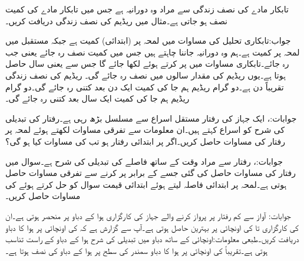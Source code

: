 تابکار مادے کی نصف زندگی  سے مراد وہ دورانیہ ہے جس میں تابکار مادے کی کمیت نصف ہو جاتی ہے۔مثال  میں ریڈیم  کی نصف زندگی دریافت کریں۔

جواب:تابکاری تحلیل کی مساوات  میں لمحہ  پر (ابتدائی) کمیت ہے جبکہ مستقبل میں لمحہ  پر کمیت  ہے۔ہم وہ دورانیہ جاننا چاہتے ہیں جس میں کمیت نصف رہ جائے یعنی جب  رہ جائے۔تابکاری مساوات میں  پر کرتے ہوئے  لکھا جائے گا جس سے   یعنی  سال  حاصل ہوتا ہے۔یوں ریڈیم کی مقدار  سالوں میں نصف رہ جائے گی۔ 
ریڈیم   کی نصف زندگی تقریباً  دن ہے۔دو گرام  ریڈیم ہم جا کی کمیت ایک دن بعد کتنی رہ جائے گی۔دو گرام ریڈیم ہم جا کی کمیت ایک سال بعد کتنی رہ جائے گی۔

جوابات:، 
ایک جہاز کی رفتار مستقل اسراع  سے مسلسل بڑھ رہی ہے۔رفتار کی تبدیلی کی شرح  کو اسراع کہتے ہیں۔ان معلومات سے تفرقی مساوات لکھتے ہوئے لمحہ  پر رفتار  کی مساوات حاصل کریں۔اگر  پر ابتدائی رفتار  ہو تب  کی مساوات کیا ہو گی؟ 

جوابات:، 
رفتار سے مراد وقت کے ساتھ فاصلے کی تبدیلی کی شرح  ہے۔سوال  میں رفتار کی مساوات  حاصل کی گئی جسے  کے برابر پر کرنے سے تفرقی مساوات حاصل ہوتی ہے۔لمحہ  پر ابتدائی فاصلہ  لیتے ہوئے ابتدائی قیمت سوال کو حل کرتے ہوئے   کی مساوات حاصل کریں۔

جوابات:
آواز سے کم رفتار پر پرواز کرنے والے جہاز کی کارگزاری ہوا کے دباو پر منحصر ہوتی ہے۔ان  کی کارگزاری  تا  کی اونچائی پر بہترین حاصل ہوتی ہے۔آپ سے گزارش ہے کہ  کی اونچائی پر ہوا کا دباو دریافت کریں۔طبعی معلومات:اونچائی کے ساتھ دباو میں تبدیلی کی شرح  ہوا کے دباو  کے راست تناسب ہوتی ہے۔تقریباً  کی اونچائی پر ہوا کا دباو سمندر کی سطح پر ہوا کے دباو  کی نصف ہوتا ہے۔

